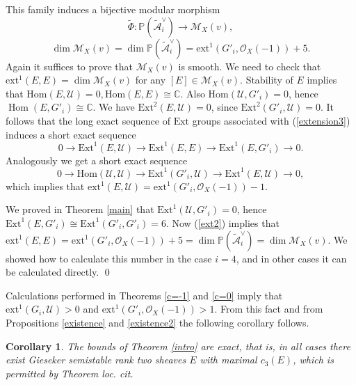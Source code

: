 \documentclass{amsart}
\DeclareMathOperator{\Hom}{Hom}
\newtheorem{corollary}[theorem]{Corollary}
\begin{document}
This family induces a bijective modular morphism
\begin{equation}\widetilde{\Phi}:\mathbb P(\widetilde{\mathcal A}_i^\vee)\to \mathcal M_X(v),
\end{equation}
\begin{equation}\dim \mathcal M_X(v)=\dim \mathbb P(\widetilde{\mathcal A}_i^\vee)=\mathrm{ext}^1(G'_i,\mathcal O_X(-1))+5.
\end{equation}
Again it suffices to prove that $\mathcal M_X(v)$ is smooth. We need to check that $\mathrm{ext}^1(E,E)=\dim \mathcal M_X(v)$ for any $[E]\in\mathcal M_X(v)$.
Stability of $E$ implies that $\mathrm{Hom}(E,\mathcal U)=0,\mathrm{Hom}(E,E)\cong\mathbb C$. 
Also $\mathrm{Hom}(\mathcal U,G'_i)=0$, hence $\Hom(E,G'_i)\cong\mathbb C$. We have $\mathrm{Ext}^2(E,\mathcal U)=0$, since $\mathrm{Ext}^2(G'_i,\mathcal U)=0$. It follows that the long exact sequence of $\mathrm{Ext}$ groups associated with (\ref{extension3}) induces a short exact sequence
\begin{equation}\label{ext2}0\to\mathrm{Ext}^1(E,\mathcal U)\to\mathrm{Ext}^1(E,E)\to\mathrm{Ext}^1(E,G'_i)\to 0.
\end{equation}
Analogously we get a short exact sequence
$$0\to\mathrm{Hom}(\mathcal U,\mathcal U)\to\mathrm{Ext}^1(G'_i,\mathcal U)\to\mathrm{Ext}^1(E,\mathcal U)\to 0,
$$
which implies that $\mathrm{ext}^1(E,\mathcal U)=\mathrm{ext}^1(G'_i,\mathcal O_X(-1))-1$. 

We proved in Theorem \ref{main} that $\mathrm{Ext}^1(\mathcal U,G'_i)=0$, hence $\mathrm{Ext}^1(E,G'_i)\cong\mathrm{Ext}^1(G'_i,G'_i)=6$. Now (\ref{ext2}) implies that $\mathrm{ext}^1(E,E)=\mathrm{ext}^1(G'_i,\mathcal O_X(-1))+5=\dim \mathbb P(\widetilde{\mathcal A}_i^\vee)=\dim \mathcal M_X(v)$. We showed how to calculate this number in the case $i=4$, and in other cases it can be calculated directly. \qed

Calculations performed in Theorems \ref{c=-1} and \ref{c=0} imply that $\mathrm{ext}^1(G_i,\mathcal U)>0$ and $\mathrm{ext}^1(G'_i,\mathcal O_X(-1))>1$. From this fact and from Propositions \ref{existence} and \ref{existence2} the following corollary follows.

\begin{corollary} The bounds of Theorem \ref{intro} are exact, that is, in all cases there exist Gieseker semistable rank two sheaves $E$ with maximal $c_3(E)$, which is permitted by Theorem \textit{loc. cit.}
\end{corollary}
\end{document}
